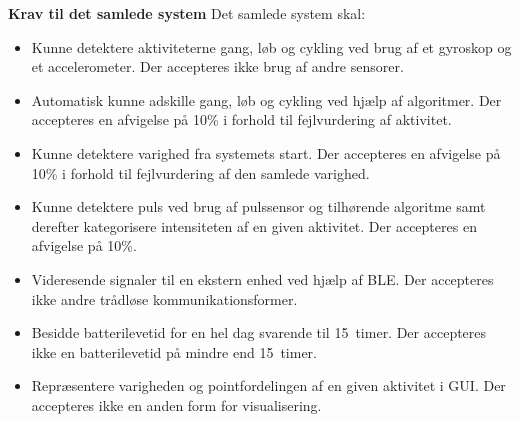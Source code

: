 \textbf{Krav til det samlede system} \newline
Det samlede system skal:
\begin{itemize}
	\item Kunne detektere aktiviteterne gang, løb og cykling ved brug af et gyroskop og et accelerometer. Der accepteres ikke brug af andre sensorer.
	\item Automatisk kunne adskille gang, løb og cykling ved hjælp af algoritmer. Der accepteres en afvigelse på 10\% i forhold til fejlvurdering af aktivitet.
	\item Kunne detektere varighed fra systemets start. Der accepteres en afvigelse på 10\% i forhold til fejlvurdering af den samlede varighed.	
	\item Kunne detektere puls ved brug af pulssensor og tilhørende algoritme samt derefter kategorisere intensiteten af en given aktivitet. Der accepteres en afvigelse på 10\%.
	\item Videresende signaler til en ekstern enhed ved hjælp af BLE. Der accepteres ikke andre trådløse kommunikationsformer.
	\item Besidde batterilevetid for en hel dag svarende til 15~timer. Der accepteres ikke en batterilevetid på mindre end 15~timer.
	\item Repræsentere varigheden og pointfordelingen af en given aktivitet i GUI. Der accepteres ikke en anden form for visualisering.	
\end{itemize}
